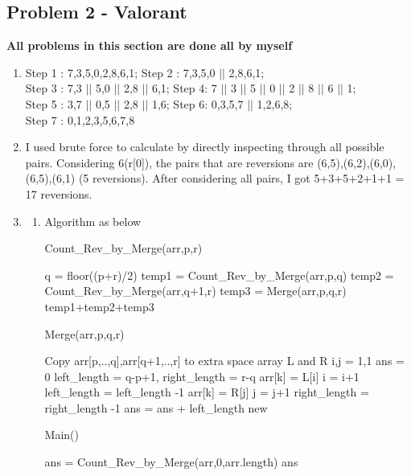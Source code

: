 \documentclass{article}
\begin{document}
\begin{CJK*}{UTF8}{bsmi}
\section{Problem 2 - Valorant}
\textbf{All problems in this section are done all by myself}
\begin{enumerate}
    \item Step 1 : 7,3,5,0,2,8,6,1; Step 2 : 7,3,5,0 $||$ 2,8,6,1; \\
          Step 3 : 7,3 $||$ 5,0 $||$ 2,8 $||$ 6,1; Step 4: 7 $||$ 3 $||$ 5 $||$ 0 $||$ 2 $||$ 8 $||$ 6 $||$ 1;\\
          Step 5 : 3,7 $||$ 0,5 $||$ 2,8 $||$ 1,6; Step 6: 0,3,5,7 $||$ 1,2,6,8;\\
          Step 7 : 0,1,2,3,5,6,7,8
    
    \item  I used brute force to calculate by directly inspecting through all possible pairs. Considering 6(r[0]),
    the pairs that are reversions are (6,5),(6,2),(6,0),(6,5),(6,1) (5 reversions). After considering all pairs, I got 5+3+5+2+1+1 = 17 reversions.
  
    \item \begin{enumerate}
        \item Algorithm as below 
        \begin{algorithm}[H]
        \caption{Count\_Rev\_by\_Merge(arr,p,r)}
        \begin{algorithmic}
        \State 
            \State q = floor((p+r)/2)
            \State temp1 = Count\_Rev\_by\_Merge(arr,p,q)
            \State temp2 = Count\_Rev\_by\_Merge(arr,q+1,r)
            \State temp3 = Merge(arr,p,q,r)
        \EndIf
        \State \Return temp1+temp2+temp3
        \end{algorithmic}
        \end{algorithm}
        \begin{algorithm}[H]
        \caption{Merge(arr,p,q,r)}
        \begin{algorithmic}
        \State Copy arr[p,..,q],arr[q+1,..,r] to extra space array L and R
        \State i,j = 1,1
        \State ans = 0
        \State left\_length = q-p+1, right\_length =  r-q
                \State arr[k] = L[i]
                \State i = i+1
                \State left\_length = left\_length -1
            \Else
                \State arr[k] = R[j]
                \State j = j+1
                \State right\_length = right\_length -1
                \State ans = ans + left\_length 
            \EndIf
        \EndFor
        \State \Return new
        \end{algorithmic}
        \end{algorithm}
        \begin{algorithm}[H]
        \caption{Main()}
        \begin{algorithmic}
         \State ans = Count\_Rev\_by\_Merge(arr,0,arr.length)
         \Return ans
        \end{algorithmic}
        \end{algorithm}
        

\end{enumerate}
\end{enumerate}
\end{CJK*}
\end{document}
